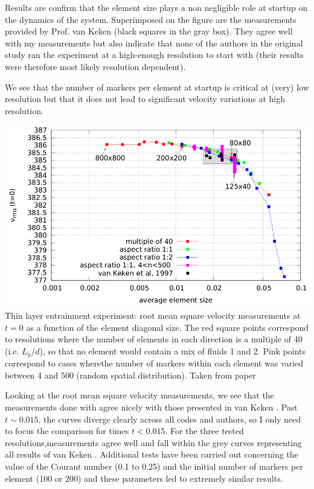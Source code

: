 Results are confirm that 
the element size plays a non negligible role at startup on the dynamics of the system.
Superimposed on the figure are the measurements provided by Prof. van Keken (black squares
in the gray box).
They agree well with my measurements but also indicate that 
none of the authors in the original study ran the experiment at a high-enough resolution
to start with (their results were therefore most likely resolution dependent).

We see that the number of markers per element at startup is critical at 
(very) low resolution but that it does not lead to 
significant velocity variations at high resolution. 

\begin{center}
\includegraphics[width=0.65\linewidth]{images/benchmark_thinlayer/thie14}\\
{\captionfont  
Thin layer entrainment experiment: root mean square velocity measurements at
$t=0$ as a function of the element diagonal size. 
The red square points correspond to resolutions where the number of elements in each direction 
is a multiple of 40 (i.e. $L_y/d$), so that no element would contain a mix of fluids 1 and 2. 
Pink points correspond to cases wherethe number of markers within each element was varied between 4 and 500 
(random spatial distribution). Taken from \elefant paper \cite{thie14}}
\end{center}


Looking at the root mean square velocity measurements, we see that
the measurements done with \elefant agree nicely with those presented in van Keken \etal \cite{vaks97}. 
Past $t\sim0.015$, the curves diverge clearly across all codes and authors, 
so I only need to focus the comparison for times $t <0.015$. 
For the three tested resolutions,measurements agree well and fall within the grey curves 
representing all results of van Keken \etal. 
Additional tests have been carried out concerning the value of the
Courant number (0.1 to 0.25) and the initial number of markers per element (100 or 200) 
and these parameters led to extremely similar results.

